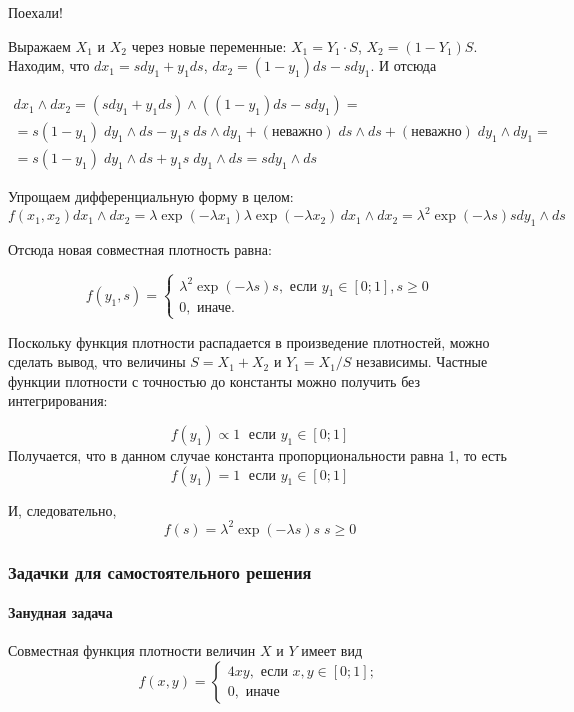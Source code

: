 \documentclass[11pt,russian,]{article}
\let\oldparagraph\paragraph
\renewcommand{\paragraph}[1]{\oldparagraph{#1}\mbox{}}
\begin{document}
Поехали!

Выражаем \(X_1\) и \(X_2\) через новые переменные:
\(X_1 = Y_1 \cdot S\), \(X_2 = (1 - Y_1) S\). Находим, что
\(dx_1 = sdy_1 + y_1 ds\), \(dx_2 = (1-y_1)ds -sdy_1\). И отсюда

\begin{multline}
dx_1 \wedge dx_2 = (sdy_1 + y_1 ds) \wedge ((1-y_1)ds -sdy_1) = \\
= s(1-y_1) \; dy_1 \wedge ds -y_1 s \; ds \wedge dy_1 + (\text{неважно}) \; ds\wedge ds + (\text{неважно}) \; dy_1 \wedge dy_1 = \\
= s(1-y_1) \; dy_1 \wedge ds + y_1 s \; dy_1 \wedge ds = s dy_1 \wedge ds
\end{multline}

Упрощаем дифференциальную форму в целом: \[
f(x_1, x_2) dx_1 \wedge dx_2 = \lambda \exp(-\lambda x_1) \lambda \exp(-\lambda x_2) \, dx_1 \wedge dx_2 = \lambda^2 \exp( -\lambda s) s dy_1 \wedge ds
\]

Отсюда новая совместная плотность равна:

\[
f(y_1, s) = \begin{cases}
\lambda^2 \exp( -\lambda s) s, \text{ если } y_1 \in [0;1], s \geq 0 \\
0, \text{ иначе.}
\end{cases}
\]

Поскольку функция плотности распадается в произведение плотностей, можно
сделать вывод, что величины \(S = X_1 + X_2\) и \(Y_1 = X_1/S\)
независимы. Частные функции плотности с точностью до константы можно
получить без интегрирования:

\[
f(y_1) \propto 1 \; \text{ если } y_1 \in [0;1] 
\] Получается, что в данном случае константа пропорциональности равна 1,
то есть \[
f(y_1) = 1 \; \text{ если } y_1 \in [0;1] 
\]

И, следовательно, \[
f(s) = \lambda^2 \exp( -\lambda s) s \; s \geq 0
\]

\subsubsection{Задачки для самостоятельного решения}\label{---}

\paragraph{Занудная задача}\label{-}

Совместная функция плотности величин \(X\) и \(Y\) имеет вид \[
f(x, y) = \begin{cases}
4xy, \text{ если } x, y \in [0;1];\\
0, \text{ иначе }
\end{cases}
\]
\end{document}
